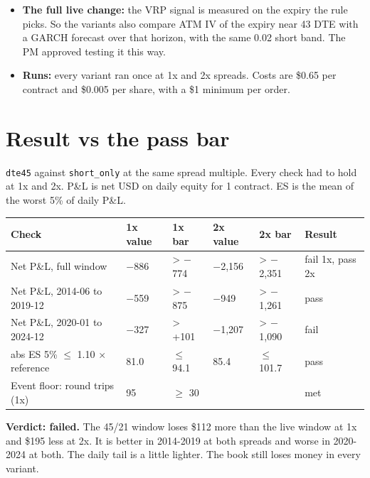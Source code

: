 \documentclass{article}
\begin{document}
\begin{itemize}
\item \textbf{The full live change:} the VRP signal is measured on the expiry the rule picks. So the variants also compare ATM IV of the expiry near 43 DTE with a GARCH forecast over that horizon, with the same 0.02 short band. The PM approved testing it this way.

\item \textbf{Runs:} every variant ran once at 1x and 2x spreads. Costs are \$0.65 per contract and \$0.005 per share, with a \$1 minimum per order.

\end{itemize}

\section{Result vs the pass bar}

\texttt{dte45} against \texttt{short\_\allowbreak{}only} at the same spread multiple. Every check had to hold at 1x and 2x. P\&L is net USD on daily equity for 1 contract. ES is the mean of the worst 5\% of daily P\&L.

\begin{center}\small
\begin{tabularx}{\linewidth}{>{\raggedright\arraybackslash}X l l l l >{\raggedright\arraybackslash}X}
\toprule
\textbf{Check} & \textbf{1x value} & \textbf{1x bar} & \textbf{2x value} & \textbf{2x bar} & \textbf{Result} \\
\midrule
Net P\&L, full window & \ensuremath{-}886 & > \ensuremath{-}774 & \ensuremath{-}2,156 & > \ensuremath{-}2,351 & fail 1x, pass 2x \\
Net P\&L, 2014-06 to 2019-12 & \ensuremath{-}559 & > \ensuremath{-}875 & \ensuremath{-}949 & > \ensuremath{-}1,261 & pass \\
Net P\&L, 2020-01 to 2024-12 & \ensuremath{-}327 & > +101 & \ensuremath{-}1,207 & > \ensuremath{-}1,090 & fail \\
abs ES 5\% \ensuremath{\leq} 1.10 \ensuremath{\times} reference & 81.0 & \ensuremath{\leq} 94.1 & 85.4 & \ensuremath{\leq} 101.7 & pass \\
Event floor: round trips (1x) & 95 & \ensuremath{\geq} 30 &  &  & met \\
\bottomrule
\end{tabularx}
\end{center}

\textbf{Verdict: failed.} The 45/\allowbreak{}21 window loses \$112 more than the live window at 1x and \$195 less at 2x. It is better in 2014-2019 at both spreads and worse in 2020-2024 at both. The daily tail is a little lighter. The book still loses money in every variant.
\end{document}
